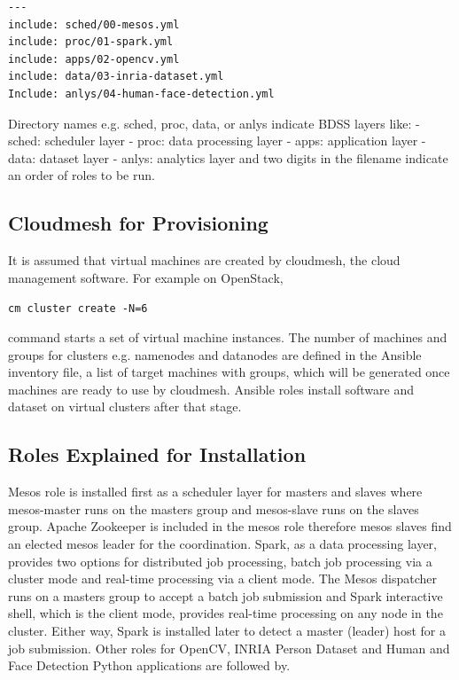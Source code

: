 \begin{verbatim}
---
include: sched/00-mesos.yml
include: proc/01-spark.yml
include: apps/02-opencv.yml
include: data/03-inria-dataset.yml
Include: anlys/04-human-face-detection.yml
\end{verbatim}

Directory names e.g. sched, proc, data, or anlys indicate BDSS layers
like: - sched: scheduler layer - proc: data processing layer - apps:
application layer - data: dataset layer - anlys: analytics layer and two
digits in the filename indicate an order of roles to be run.

\subsection{Cloudmesh for
Provisioning}\label{cloudmesh-for-provisioning}

It is assumed that virtual machines are created by cloudmesh, the cloud
management software. For example on OpenStack,

\texttt{cm\ cluster\ create\ -N=6}

command starts a set of virtual machine instances. The number of
machines and groups for clusters e.g. namenodes and datanodes are
defined in the Ansible inventory file, a list of target machines with
groups, which will be generated once machines are ready to use by
cloudmesh. Ansible roles install software and dataset on virtual
clusters after that stage.

\subsection{Roles Explained for
Installation}\label{roles-explained-for-installation}

Mesos role is installed first as a scheduler layer for masters and
slaves where mesos-master runs on the masters group and mesos-slave runs
on the slaves group. Apache Zookeeper is included in the mesos role
therefore mesos slaves find an elected mesos leader for the
coordination. Spark, as a data processing layer, provides two options
for distributed job processing, batch job processing via a cluster mode
and real-time processing via a client mode. The Mesos dispatcher runs on
a masters group to accept a batch job submission and Spark interactive
shell, which is the client mode, provides real-time processing on any
node in the cluster. Either way, Spark is installed later to detect a
master (leader) host for a job submission. Other roles for OpenCV, INRIA
Person Dataset and Human and Face Detection Python applications are
followed by.

